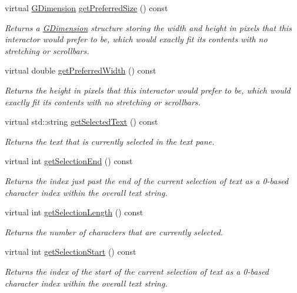 \begin{DoxyCompactItemize}
virtual \mbox{\hyperlink{structGDimension}{G\+Dimension}} \mbox{\hyperlink{classGInteractor_a4aabbee761d8e9116275401131b7ccd1}{get\+Preferred\+Size}} () const
\begin{DoxyCompactList}\small\item\em Returns a \mbox{\hyperlink{structGDimension}{G\+Dimension}} structure storing the width and height in pixels that this interactor would prefer to be, which would exactly fit its contents with no stretching or scrollbars. \end{DoxyCompactList}\item 
virtual double \mbox{\hyperlink{classGInteractor_a82bca31d37700fb0e35d2743352efd5e}{get\+Preferred\+Width}} () const
\begin{DoxyCompactList}\small\item\em Returns the height in pixels that this interactor would prefer to be, which would exactly fit its contents with no stretching or scrollbars. \end{DoxyCompactList}\item 
virtual std\+::string \mbox{\hyperlink{classGBrowserPane_a512371b3f41599349f23389825a6ccf7}{get\+Selected\+Text}} () const
\begin{DoxyCompactList}\small\item\em Returns the text that is currently selected in the text pane. \end{DoxyCompactList}\item 
virtual int \mbox{\hyperlink{classGBrowserPane_a2885313daa0e367cee2ccd0c704a6147}{get\+Selection\+End}} () const
\begin{DoxyCompactList}\small\item\em Returns the index just past the end of the current selection of text as a 0-\/based character index within the overall text string. \end{DoxyCompactList}\item 
virtual int \mbox{\hyperlink{classGBrowserPane_a68f7816694269b73e6284e756eb0c179}{get\+Selection\+Length}} () const
\begin{DoxyCompactList}\small\item\em Returns the number of characters that are currently selected. \end{DoxyCompactList}\item 
virtual int \mbox{\hyperlink{classGBrowserPane_aad7c986a677c1b9cf445cd7cfb6a8975}{get\+Selection\+Start}} () const
\begin{DoxyCompactList}\small\item\em Returns the index of the start of the current selection of text as a 0-\/based character index within the overall text string. \end{DoxyCompactList}\item 

\end{DoxyCompactItemize}
